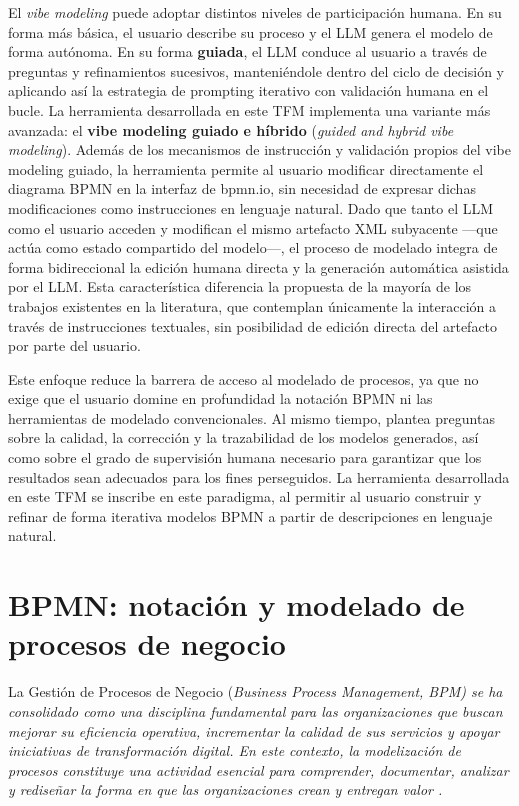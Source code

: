 El \textit{vibe modeling} puede adoptar distintos niveles de participación humana. En su forma más básica, el usuario describe su proceso y el LLM genera el modelo de forma autónoma. En su forma \textbf{guiada}, el LLM conduce al usuario a través de preguntas y refinamientos sucesivos, manteniéndole dentro del ciclo de decisión y aplicando así la estrategia de prompting iterativo con validación humana en el bucle. La herramienta desarrollada en este TFM implementa una variante más avanzada: el \textbf{vibe modeling guiado e híbrido} (\textit{guided and hybrid vibe modeling}). Además de los mecanismos de instrucción y validación propios del vibe modeling guiado, la herramienta permite al usuario modificar directamente el diagrama BPMN en la interfaz de bpmn.io, sin necesidad de expresar dichas modificaciones como instrucciones en lenguaje natural. Dado que tanto el LLM como el usuario acceden y modifican el mismo artefacto XML subyacente —que actúa como estado compartido del modelo—, el proceso de modelado integra de forma bidireccional la edición humana directa y la generación automática asistida por el LLM. Esta característica diferencia la propuesta de la mayoría de los trabajos existentes en la literatura, que contemplan únicamente la interacción a través de instrucciones textuales, sin posibilidad de edición directa del artefacto por parte del usuario.

Este enfoque reduce la barrera de acceso al modelado de procesos, ya que no exige que el usuario domine en profundidad la notación BPMN ni las herramientas de modelado convencionales. Al mismo tiempo, plantea preguntas sobre la calidad, la corrección y la trazabilidad de los modelos generados, así como sobre el grado de supervisión humana necesario para garantizar que los resultados sean adecuados para los fines perseguidos. La herramienta desarrollada en este TFM se inscribe en este paradigma, al permitir al usuario construir y refinar de forma iterativa modelos BPMN a partir de descripciones en lenguaje natural.



\section{BPMN: notación y modelado de procesos de negocio}

La Gestión de Procesos de Negocio (\textit{Business Process Management, BPM) se ha consolidado como una disciplina fundamental para las organizaciones que buscan mejorar su eficiencia operativa, incrementar la calidad de sus servicios y apoyar iniciativas de transformación digital. En este contexto, la modelización de procesos constituye una actividad esencial para comprender, documentar, analizar y rediseñar la forma en que las organizaciones crean y entregan valor \cite{dumas2018fundamentals, weske2019}.}

